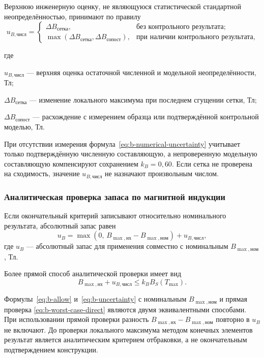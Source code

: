 \documentclass[14pt,a4paper]{extarticle}
\newenvironment{whereblock}
 {\par\noindent где\par
  \begin{list}{}{\setlength{\leftmargin}{12.5mm}
                  \setlength{\itemindent}{-12.5mm}
                  \setlength{\itemsep}{0pt}
                  \setlength{\parsep}{0pt}
                  \setlength{\topsep}{0pt}}}
 {\end{list}}
\newcommand{\whereitem}[2]{\item[] #1 --- #2}
\begin{document}
Верхнюю инженерную оценку, не являющуюся статистической стандартной
неопределённостью, принимают по правилу
\begin{equation}
 u_{B,\text{числ}}=
 \begin{cases}
  \Delta B_{\text{сетка}},
  &\text{без контрольного результата};\\
  \max\!\left(\Delta B_{\text{сетка}},
  \Delta B_{\text{сопост}}\right),
  &\text{при наличии контрольного результата},
 \end{cases}
 \label{eq:b-numerical-uncertainty}
\end{equation}
\begin{whereblock}
\whereitem{$u_{B,\text{числ}}$}{верхняя оценка остаточной численной и
модельной неопределённости, Тл;}
\whereitem{$\Delta B_{\text{сетка}}$}{изменение локального максимума при
последнем сгущении сетки, Тл;}
\whereitem{$\Delta B_{\text{сопост}}$}{расхождение с измерением образца
или подтверждённой контрольной моделью, Тл.}
\end{whereblock}

При отсутствии измерения формула~\eqref{eq:b-numerical-uncertainty}
учитывает только подтверждённую численную составляющую, а непроверенную
модельную составляющую компенсируют сохранением $k_B=0{,}60$. Если сетка
не проверена на сходимость, значение $u_{B,\text{числ}}$ не назначают
произвольным числом.

\subsubsection{Аналитическая проверка запаса по магнитной индукции}

Если окончательный критерий записывают относительно номинального
результата, абсолютный запас равен
\begin{equation}
 u_B=
 \max\left(
 0,\,
 B_{\max,\text{нх}}-B_{\max,\text{ном}}
 \right)
 +u_{B,\text{числ}},
 \label{eq:b-uncertainty}
\end{equation}
где $u_B$ --- абсолютный запас для применения совместно с номинальным
$B_{\max,\text{ном}}$, Тл.

Более прямой способ аналитической проверки имеет вид
\begin{equation}
 B_{\max,\text{нх}}+u_{B,\text{числ}}
 \leq k_B B_S(T_{\max}).
 \label{eq:b-worst-case-direct}
\end{equation}

Формулы~\eqref{eq:b-allow} и~\eqref{eq:b-uncertainty} с номинальным
$B_{\max,\text{ном}}$ и прямая проверка
\eqref{eq:b-worst-case-direct} являются двумя эквивалентными способами.
При использовании прямой проверки разность
$B_{\max,\text{нх}}-B_{\max,\text{ном}}$ повторно в $u_B$ не включают.
До проверки локального максимума методом конечных элементов результат
является аналитическим критерием отбраковки, а не окончательным
подтверждением конструкции.
\end{document}
